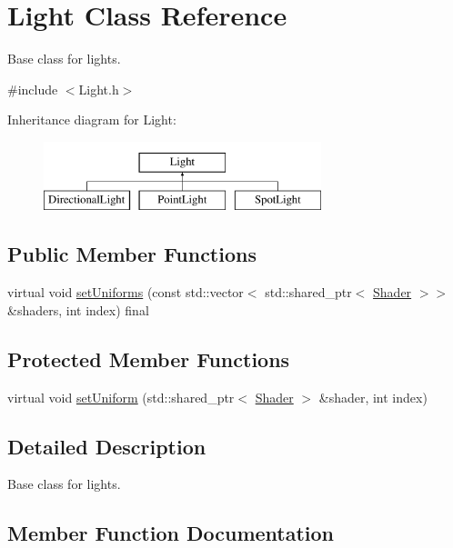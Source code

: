 \hypertarget{class_light}{}\section{Light Class Reference}
\label{class_light}


Base class for lights.  




{\ttfamily \#include $<$Light.\+h$>$}

Inheritance diagram for Light\+:\begin{figure}[H]
\begin{center}
\leavevmode
\includegraphics[height=2.000000cm]{class_light}
\end{center}
\end{figure}
\subsection*{Public Member Functions}
\begin{DoxyCompactItemize}
\item 
virtual void \mbox{\hyperlink{class_light_ab1ee3d3938cbd1a29914ae1635155c17}{set\+Uniforms}} (const std\+::vector$<$ std\+::shared\+\_\+ptr$<$ \mbox{\hyperlink{class_shader}{Shader}} $>$$>$ \&shaders, int index) final
\end{DoxyCompactItemize}
\subsection*{Protected Member Functions}
\begin{DoxyCompactItemize}
\item 
virtual void \mbox{\hyperlink{class_light_a05d202e42ffec4c8bece9c18b4d4541e}{set\+Uniform}} (std\+::shared\+\_\+ptr$<$ \mbox{\hyperlink{class_shader}{Shader}} $>$ \&shader, int index)
\end{DoxyCompactItemize}


\subsection{Detailed Description}
Base class for lights. 



\subsection{Member Function Documentation}
\mbox{\label{class_light_a05d202e42ffec4c8bece9c18b4d4541e}} 
